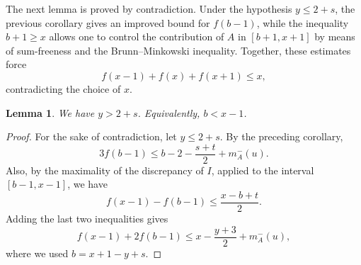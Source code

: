 \documentclass[11pt,reqno]{amsart}
\newtheorem{lem}[thm]{Lemma}
\theoremstyle{definition}
\def\F#1{f(#1)}
\begin{document}
The next lemma is proved by contradiction. Under the hypothesis $y\leq 2+s$, the previous corollary gives an improved bound for $\F{b-1}$, while the inequality $b+1\geq x$ allows one to control the contribution of $A$ in $[b+1,x+1]$ by means of sum-freeness and the Brunn--Minkowski inequality. Together, these estimates force
$$
\F{x-1}+\F{x}+\F{x+1}\leq x,
$$
contradicting the choice of $x$.
\begin{lem}
    We have $y > 2 + s$. Equivalently, $b < x - 1$. 
\end{lem}
\begin{proof}
    For the sake of contradiction, let $y\leq 2 + s$. By the preceding corollary, 
    \begin{equation*}
        3\F{b - 1}\leq b - 2 - \frac{s + t}{2} + m_A^-(u). 
    \end{equation*}
Also, by the maximality of the discrepancy of $I$, applied to the interval $[b-1,x-1]$, we have 
$$ 
\F{x-1}-\F{b-1}\leq \frac{x-b+t}{2}. 
$$ 
Adding the last two inequalities gives 
$$
\F{x-1}+2\F{b-1} \leq x-\frac{y+3}{2}+m_A^-(u), 
$$ 
where we used $b=x+1-y+s$.



\end{proof}
\end{document}
